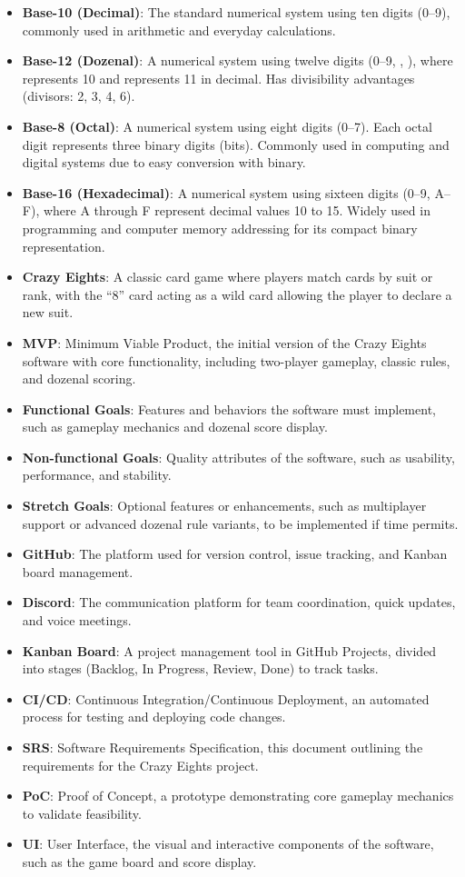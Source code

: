 \documentclass[12pt]{article}
\begin{document}
\begin{itemize}
    \item \textbf{Base-10 (Decimal)}: The standard numerical system using ten digits (0--9), commonly used in arithmetic and everyday calculations.
    \item \textbf{Base-12 (Dozenal)}: A numerical system using twelve digits (0--9, , ), where  represents 10 and  represents 11 in decimal. Has divisibility advantages (divisors: 2, 3, 4, 6).
    \item \textbf{Base-8 (Octal)}: A numerical system using eight digits (0--7). Each octal digit represents three binary digits (bits). Commonly used in computing and digital systems due to easy conversion with binary.
    \item \textbf{Base-16 (Hexadecimal)}: A numerical system using sixteen digits (0--9, A--F), where A through F represent decimal values 10 to 15. Widely used in programming and computer memory addressing for its compact binary representation.
    \item \textbf{Crazy Eights}: A classic card game where players match cards by suit or rank, with the ``8'' card acting as a wild card allowing the player to declare a new suit.
    \item \textbf{MVP}: Minimum Viable Product, the initial version of the Crazy Eights software with core functionality, including two-player gameplay, classic rules, and dozenal scoring.
    \item \textbf{Functional Goals}: Features and behaviors the software must implement, such as gameplay mechanics and dozenal score display.
    \item \textbf{Non-functional Goals}: Quality attributes of the software, such as usability, performance, and stability.
    \item \textbf{Stretch Goals}: Optional features or enhancements, such as multiplayer support or advanced dozenal rule variants, to be implemented if time permits.
    \item \textbf{GitHub}: The platform used for version control, issue tracking, and Kanban board management.
    \item \textbf{Discord}: The communication platform for team coordination, quick updates, and voice meetings.
    \item \textbf{Kanban Board}: A project management tool in GitHub Projects, divided into stages (Backlog, In Progress, Review, Done) to track tasks.
    \item \textbf{CI/CD}: Continuous Integration/Continuous Deployment, an automated process for testing and deploying code changes.
    \item \textbf{SRS}: Software Requirements Specification, this document outlining the requirements for the Crazy Eights project.
    \item \textbf{PoC}: Proof of Concept, a prototype demonstrating core gameplay mechanics to validate feasibility.
    \item \textbf{UI}: User Interface, the visual and interactive components of the software, such as the game board and score display.
\end{itemize}
\end{document}
